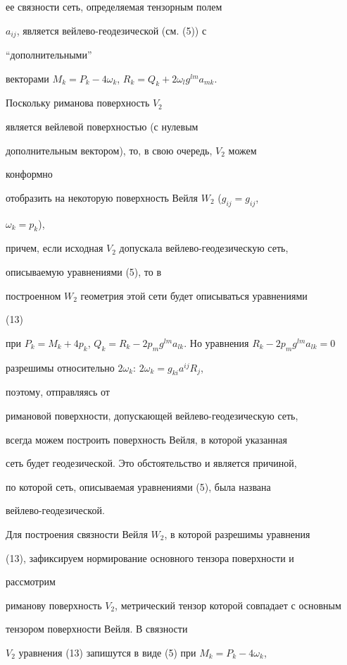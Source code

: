 ее связности сеть, определяемая тензорным полем


$a_{ij}$, является вейлево-геодезической (см. (5)) с 


``дополнительными'' 


векторами $M_k=P_k-4\omega_k$, $R_k=Q_k+2\omega_l g^{lm}a_{mk}$. 


Поскольку риманова поверхность $V_2$ 


является вейлевой поверхностью (с нулевым  


дополнительным вектором), то, в свою очередь, $V_2$ можем 


конформно 


отобразить на некоторую поверхность Вейля $W_2$ ($g_{ij}=g_{ij}$, 


$\omega_k=p_k$), 


причем, если исходная $V_2$ допускала вейлево-геодезическую сеть,


описываемую уравнениями (5), то в  


построенном $W_2$ геометрия этой сети будет описываться уравнениями 


(13) 


при $P_k=M_k+4p_k$, $Q_k=R_k-2p_m g^{lm}a_{lk}$. Но уравнения $R_k-2p_m 


g^{lm}a_{lk}=0$ 


разрешимы относительно $2\omega_k$: $2\omega_k=g_{ki}a^{ij}R_j$, 


поэтому, отправляясь от 


римановой поверхности, допускающей вейлево-геодезическую сеть,


всегда можем построить поверхность Вейля, в которой указанная 


сеть будет геодезической. Это обстоятельство и является причиной,


по которой сеть, описываемая уравнениями (5), была названа


вейлево-геодезической.


 


Для построения связности Вейля $W_2$, в которой разрешимы уравнения 


(13), зафиксируем нормирование основного тензора поверхности и 


рассмотрим 


риманову поверхность $V_2$, метрический тензор которой совпадает с основным 


тензором поверхности Вейля. В связности


$V_2$ уравнения (13) запишутся в виде (5) при $M_k=P_k-4\omega_k$, 



